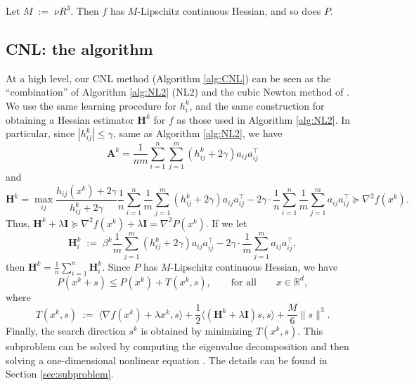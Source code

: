\documentclass[10pt]{article}
\newcommand{\eqdef}{\; { := }\;}
\newcommand{\R}{\mathbb{R}}
\newcommand{\newalpha}{h}
\newcommand{\mA}{\mathbf{A}}
\newcommand{\mH}{\mathbf{H}}
\newcommand{\mI}{\mathbf{I}}
\begin{document}
Let $M \eqdef \nu R^3$. Then $f$ has $M$-Lipschitz continuous Hessian, and so does $P$. 

\subsection{{\sf CNL}: the algorithm}



  At a high level, our {\sf CNL} method (Algorithm \ref{alg:CNL}) can be seen as the ``combination'' of  Algorithm \ref{alg:NL2} ({\sf NL2}) and the cubic Newton method of \citet{Griewank-cubic-1981, PN2006-cubic}. We use the same learning procedure for $h_i^k$, and the same construction for obtaining a Hessian estimator $\mH^k$ for $f$ as those used in Algorithm \ref{alg:NL2}. In particular, since $|h_{ij}^k| \leq \gamma$, same as Algorithm \ref{alg:NL2}, we have 
$$
\mA^k = \frac{1}{nm} \sum_{i=1}^n \sum_{j=1}^{m}(h_{ij}^k + 2\gamma) a_{ij}a_{ij}^\top
$$ 
and  $$\mH^k = \max_{ij} \frac{\newalpha_{ij}(x^k) + 2\gamma}{h_{ij}^k + 2\gamma} \frac{1}{n} \sum_{i=1}^n \frac{1}{m}\sum_{j=1}^{m}(h_{ij}^k + 2\gamma) a_{ij}a_{ij}^\top - 2\gamma \cdot \frac{1}{n} \sum_{i=1}^n \frac{1}{m} \sum_{j=1}^{m}a_{ij}a_{ij}^\top \succeq \nabla^2 f(x^k).$$ Thus, $\mH^k + \lambda \mI \succeq \nabla^2 f(x^k) + \lambda \mI = \nabla^2 P(x^k)$. If we let $$\mH_i^k \eqdef \beta^k \frac{1}{m}\sum_{j=1}^{m}(h_{ij}^k + 2\gamma) a_{ij}a_{ij}^\top - 2\gamma \cdot \frac{1}{m} \sum_{j=1}^{m}a_{ij}a_{ij}^\top,$$ then $\mH^k = \frac{1}{n} \sum_{i=1}^n \mH^k_i$.  Since $P$ has $M$-Lipschitz continuous Hessian, we have $$P(x^k+s) \leq P(x^k) + T(x^k, s), \qquad \text{for all} \qquad x\in \R^d,$$ where 
$$
T(x^k, s) \eqdef \langle \nabla f(x^k) + \lambda x^k, s \rangle + \frac{1}{2} \langle (\mH^k + \lambda \mI)s, s \rangle + \frac{M}{6}\|s\|^3. 
$$
Finally, the search direction $s^k$ is obtained by minimizing $T(x^k, s)$. This subproblem can be solved by computing the eigenvalue decomposition and then solving a one-dimensional nonlinear equation \citep{hanzely2020stochastic,gould2010solving}. The details can be found in Section \ref{sec:subproblem}. 
\end{document}
